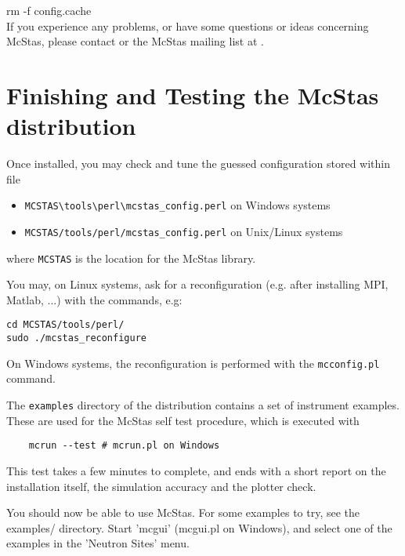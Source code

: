     rm -f config.cache\\


\noindent If you experience any problems, or have some questions or ideas
concerning McStas, please contact
or the McStas mailing list at .

\section{Finishing and Testing the McStas distribution}
\label{s:testing}

Once installed, you may check and tune the guessed configuration stored within file
\begin{itemize}
\item{\verb+MCSTAS\tools\perl\mcstas_config.perl+ on Windows systems}
\item{\verb+MCSTAS/tools/perl/mcstas_config.perl+ on Unix/Linux systems}
\end{itemize}
where \verb+MCSTAS+ is the location for the McStas library.

You may, on Linux systems, ask for a reconfiguration (e.g. after installing MPI, Matlab, ...) with the commands, e.g:
\begin{verbatim}
cd MCSTAS/tools/perl/
sudo ./mcstas_reconfigure
\end{verbatim}
On Windows systems, the reconfiguration is performed with the \verb+mcconfig.pl+ command.

The \verb+examples+ directory of the distribution contains a set of instrument examples. These are used for the McStas self test procedure, which is executed with
\begin{verbatim}
    mcrun --test # mcrun.pl on Windows
\end{verbatim}
This test takes a few minutes to complete, and ends with a short report on the installation itself, the simulation accuracy and the plotter check.

You should now be able to use McStas. For some examples to try, see the
examples/ directory. Start 'mcgui' (mcgui.pl on Windows), and select one of the examples in the 'Neutron Sites' menu.
